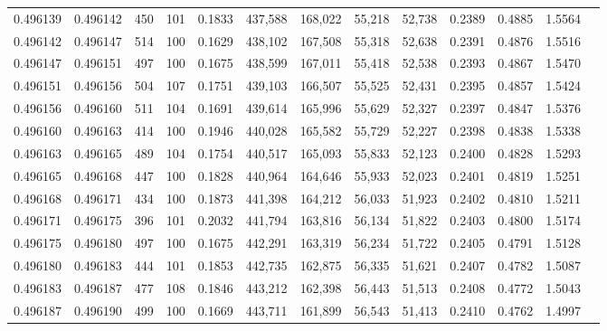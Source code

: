 \begin{tabular}{rrrrrrrrrrrrr}
0.496139 & 0.496142 &   450 & 101 &                                     0.1833 & 437,588 & 168,022 &  55,218 &  52,738 & 0.2389 & 0.4885 & 1.5564 \\
0.496142 & 0.496147 &   514 & 100 &                                     0.1629 & 438,102 & 167,508 &  55,318 &  52,638 & 0.2391 & 0.4876 & 1.5516 \\
0.496147 & 0.496151 &   497 & 100 &                                     0.1675 & 438,599 & 167,011 &  55,418 &  52,538 & 0.2393 & 0.4867 & 1.5470 \\
0.496151 & 0.496156 &   504 & 107 &                                     0.1751 & 439,103 & 166,507 &  55,525 &  52,431 & 0.2395 & 0.4857 & 1.5424 \\
0.496156 & 0.496160 &   511 & 104 &                                     0.1691 & 439,614 & 165,996 &  55,629 &  52,327 & 0.2397 & 0.4847 & 1.5376 \\
0.496160 & 0.496163 &   414 & 100 &                                     0.1946 & 440,028 & 165,582 &  55,729 &  52,227 & 0.2398 & 0.4838 & 1.5338 \\
0.496163 & 0.496165 &   489 & 104 &                                     0.1754 & 440,517 & 165,093 &  55,833 &  52,123 & 0.2400 & 0.4828 & 1.5293 \\
0.496165 & 0.496168 &   447 & 100 &                                     0.1828 & 440,964 & 164,646 &  55,933 &  52,023 & 0.2401 & 0.4819 & 1.5251 \\
0.496168 & 0.496171 &   434 & 100 &                                     0.1873 & 441,398 & 164,212 &  56,033 &  51,923 & 0.2402 & 0.4810 & 1.5211 \\
0.496171 & 0.496175 &   396 & 101 &                                     0.2032 & 441,794 & 163,816 &  56,134 &  51,822 & 0.2403 & 0.4800 & 1.5174 \\
0.496175 & 0.496180 &   497 & 100 &                                     0.1675 & 442,291 & 163,319 &  56,234 &  51,722 & 0.2405 & 0.4791 & 1.5128 \\
0.496180 & 0.496183 &   444 & 101 &                                     0.1853 & 442,735 & 162,875 &  56,335 &  51,621 & 0.2407 & 0.4782 & 1.5087 \\
0.496183 & 0.496187 &   477 & 108 &                                     0.1846 & 443,212 & 162,398 &  56,443 &  51,513 & 0.2408 & 0.4772 & 1.5043 \\
0.496187 & 0.496190 &   499 & 100 &                                     0.1669 & 443,711 & 161,899 &  56,543 &  51,413 & 0.2410 & 0.4762 & 1.4997 \\

\end{tabular}
